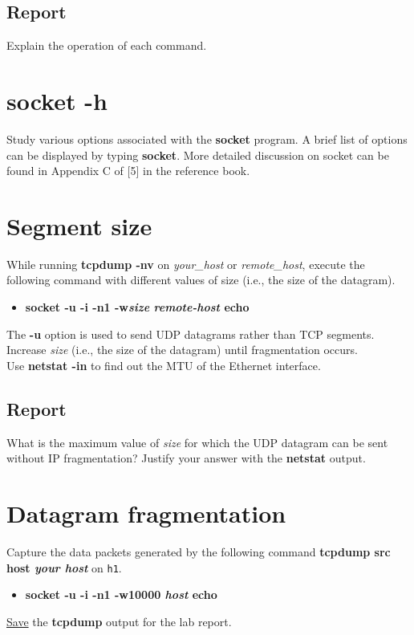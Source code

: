 \documentclass[10pt,a4paper]{article}
\numberwithin{equation}{section}
\numberwithin{figure}{section}
\numberwithin{table}{section}
\begin{document}
	\subsection*{Report}
	Explain the operation of each command.

\section{socket -h}
	Study various options associated with the \textbf{socket} program.
	A brief list of options can be displayed by typing \textbf{socket}. More detailed discussion on socket can be found in
	Appendix C of [5] in the reference book.

\section{Segment size}
	While running \textbf{tcpdump -nv} on \textit{your\_host} or \textit{remote\_host}, execute the following command with different values of size (i.e., the size of the datagram). \\
	\begin{itemize}
		\item \textbf{socket -u -i -n1 -w\textit{size} \textit{remote-host} echo}
	\end{itemize}
	The \textbf{-u} option is used to send UDP datagrams rather than TCP segments. \\
	Increase \textit{size} (i.e., the size of the datagram) until fragmentation occurs. \\
	Use \textbf{netstat -in} to find out the MTU of the Ethernet interface.

	\subsection*{Report}
	What is the maximum value of \textit{size} for which the UDP datagram can be sent without IP fragmentation?
	Justify your answer with the \textbf{netstat} output.

\section{Datagram fragmentation}
	Capture the data packets generated by the following command \textbf{tcpdump src host \textit{your host}} on \texttt{h1}. \\
	\begin{itemize}
		\item \textbf{socket -u -i -n1 -w10000 \textit{host} echo}
	\end{itemize}
	\underline{Save} the \textbf{tcpdump} output for the lab report.
\end{document}
